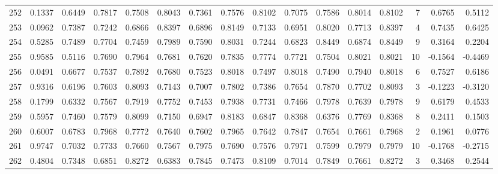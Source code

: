 \begin{tabular}{lrrrrrrrrrrrrrrr}
252 &      0.1337 &  0.6449 &  0.7817 &  0.7508 &  0.8043 &  0.7361 &  0.7576 &  0.8102 &  0.7075 &  0.7586 &   0.8014 &     0.8102 &      7 &                    0.6765 &                     0.5112 \\
253 &      0.0962 &  0.7387 &  0.7242 &  0.6866 &  0.8397 &  0.6896 &  0.8149 &  0.7133 &  0.6951 &  0.8020 &   0.7713 &     0.8397 &      4 &                    0.7435 &                     0.6425 \\
254 &      0.5285 &  0.7489 &  0.7704 &  0.7459 &  0.7989 &  0.7590 &  0.8031 &  0.7244 &  0.6823 &  0.8449 &   0.6874 &     0.8449 &      9 &                    0.3164 &                     0.2204 \\
255 &      0.9585 &  0.5116 &  0.7690 &  0.7964 &  0.7681 &  0.7620 &  0.7835 &  0.7774 &  0.7721 &  0.7504 &   0.8021 &     0.8021 &     10 &                   -0.1564 &                    -0.4469 \\
256 &      0.0491 &  0.6677 &  0.7537 &  0.7892 &  0.7680 &  0.7523 &  0.8018 &  0.7497 &  0.8018 &  0.7490 &   0.7940 &     0.8018 &      6 &                    0.7527 &                     0.6186 \\
257 &      0.9316 &  0.6196 &  0.7603 &  0.8093 &  0.7143 &  0.7007 &  0.7802 &  0.7386 &  0.7654 &  0.7870 &   0.7702 &     0.8093 &      3 &                   -0.1223 &                    -0.3120 \\
258 &      0.1799 &  0.6332 &  0.7567 &  0.7919 &  0.7752 &  0.7453 &  0.7938 &  0.7731 &  0.7466 &  0.7978 &   0.7639 &     0.7978 &      9 &                    0.6179 &                     0.4533 \\
259 &      0.5957 &  0.7460 &  0.7579 &  0.8099 &  0.7150 &  0.6947 &  0.8183 &  0.6847 &  0.8368 &  0.6376 &   0.7769 &     0.8368 &      8 &                    0.2411 &                     0.1503 \\
260 &      0.6007 &  0.6783 &  0.7968 &  0.7772 &  0.7640 &  0.7602 &  0.7965 &  0.7642 &  0.7847 &  0.7654 &   0.7661 &     0.7968 &      2 &                    0.1961 &                     0.0776 \\
261 &      0.9747 &  0.7032 &  0.7733 &  0.7660 &  0.7567 &  0.7975 &  0.7690 &  0.7576 &  0.7971 &  0.7599 &   0.7979 &     0.7979 &     10 &                   -0.1768 &                    -0.2715 \\
262 &      0.4804 &  0.7348 &  0.6851 &  0.8272 &  0.6383 &  0.7845 &  0.7473 &  0.8109 &  0.7014 &  0.7849 &   0.7661 &     0.8272 &      3 &                    0.3468 &                     0.2544 \\

\end{tabular}
